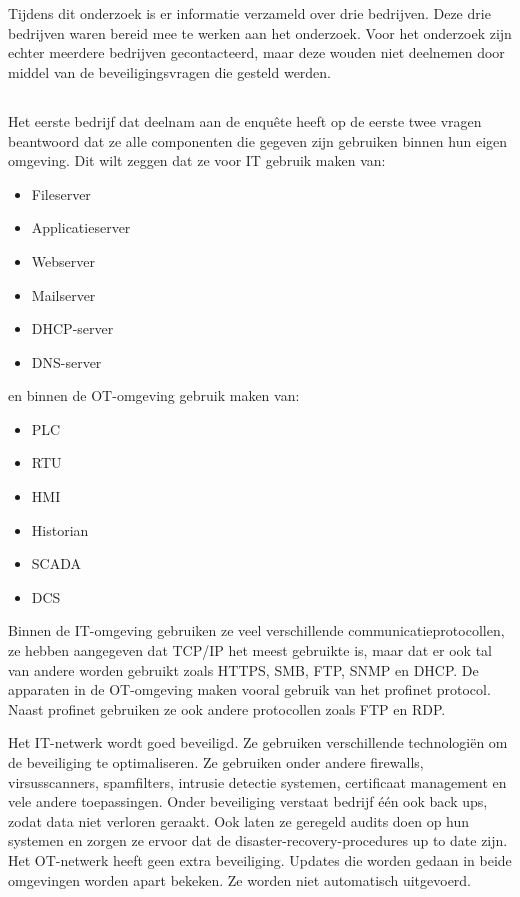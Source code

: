 \chapter{}
\label{ch:Resultaten}
Tijdens dit onderzoek is er informatie verzameld over drie bedrijven. Deze drie bedrijven waren bereid mee te werken aan het onderzoek. Voor het onderzoek zijn echter meerdere bedrijven gecontacteerd, maar deze wouden niet deelnemen door middel van de beveiligingsvragen die gesteld werden. 

\section{}
\label{sec:Bedrijf 1}
Het eerste bedrijf dat deelnam aan de enquête heeft op de eerste twee vragen beantwoord dat ze alle componenten die gegeven zijn gebruiken binnen hun eigen omgeving. Dit wilt zeggen dat ze voor IT gebruik maken van: 
\begin{itemize}
    \item Fileserver
    \item Applicatieserver
    \item Webserver
    \item Mailserver
    \item DHCP-server
    \item DNS-server
\end{itemize}
en binnen de OT-omgeving gebruik maken van: 
\begin{itemize}
    \item PLC
    \item RTU
    \item HMI
    \item Historian
    \item SCADA
    \item DCS
\end{itemize}

Binnen de IT-omgeving gebruiken ze veel verschillende communicatieprotocollen, ze hebben aangegeven dat TCP/IP het meest gebruikte is, maar dat er ook tal van andere worden gebruikt zoals HTTPS, SMB, FTP, SNMP en DHCP. De apparaten in de OT-omgeving maken vooral gebruik van het profinet protocol. Naast profinet gebruiken ze ook andere protocollen zoals FTP en RDP. 

Het IT-netwerk wordt goed beveiligd. Ze gebruiken verschillende technologiën om de beveiliging te optimaliseren. Ze gebruiken onder andere firewalls, virsusscanners, spamfilters, intrusie detectie systemen, certificaat management en vele andere toepassingen. Onder beveiliging verstaat bedrijf één ook back ups, zodat data niet verloren geraakt. Ook laten ze geregeld audits doen op hun systemen en zorgen ze ervoor dat de disaster-recovery-procedures up to date zijn. Het OT-netwerk heeft geen extra beveiliging. Updates die worden gedaan in beide omgevingen worden apart bekeken. Ze worden niet automatisch uitgevoerd. 

